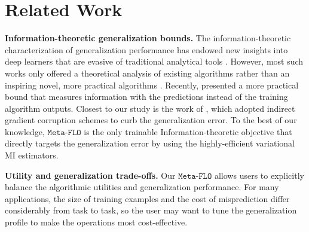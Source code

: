 \documentclass[nohyperref]{article}
\theoremstyle{plain}
\theoremstyle{definition}
\theoremstyle{remark}
\newcommand{\FLO}{\texttt{FLO}}
\newcommand{\Transformer}{\texttt{Transformer}}
\newcommand{\metaflo}{\texttt{Meta-FLO} }
\begin{document}


\section{Related Work}

{\bf Information-theoretic generalization bounds.} The information-theoretic characterization of generalization performance has endowed new insights into deep learners that are evasive of traditional analytical tools \citep{xu2017information, asadi2018chaining, bu2020tightening, steinke2020reasoning}. However, most such works only offered a theoretical analysis of existing algorithms rather than an inspiring novel, more practical algorithms \citep{negrea2019information, neu2021information}. Recently, \citet{harutyunyan2021information} presented a more practical bound that measures information with the predictions instead of the training algorithm outputs. Closest to our study is the work of \citep{chen2021generalization}, which adopted indirect gradient corruption schemes to curb the generalization error. To the best of our knowledge, $\metaflo$ is the only trainable Information-theoretic objective that directly targets the generalization error by using the highly-efficient variational MI estimators. 


{\bf Utility and generalization trade-offs.}  Our $\metaflo$ allows users to explicitly balance the algorithmic utilities and generalization performance. For many applications, the size of training examples and the cost of misprediction differ considerably from task to task, so the user may want to tune the generalization profile to make the operations most cost-effective. 
\end{document}

